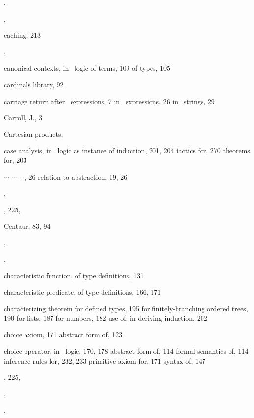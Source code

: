 \begin{theindex}
  \indexspace

  \item {}, 
  \item {}, 
  \item caching, 213
  \item {}, 
  \item canonical contexts, in \HOL\ logic
    \subitem of terms, 109
    \subitem of types, 105
  \item cardinals library, 92
  \item carriage return
    \subitem after \ML\ expressions, 7
    \subitem in \ML\ expressions, 26
    \subitem in \ML\ strings, 29
  \item Carroll, J., 3
  \item Cartesian products, 
  \item case analysis, in \HOL\ logic
    \subitem as instance  of induction, 201, 204
    \subitem tactics for, 270
    \subitem theorems for, 203
  \item {\small{} $\cdots$  $\cdots$ \ml{|} $\cdots$}, 26
    \subitem relation to abstraction, 19, 26
  \item {}, 
  \item {}, 225, 
  \item Centaur, 83, 94
  \item {}, 
  \item {}, 
  \item characteristic function, of type definitions, 131
  \item characteristic predicate, of type definitions, 166, 171
  \item characterizing theorem
    \subitem for defined types, 195
    \subitem for finitely-branching ordered trees, 190
    \subitem for lists, 187
    \subitem for numbers, 182
    \subitem use of, in deriving induction, 202
  \item choice axiom, 171
    \subitem abstract form of, 123
  \item choice operator, in \HOL\ logic, 170, 178
    \subitem abstract form of, 114
    \subitem formal semantics of, 114
    \subitem inference rules for, 232, 233
    \subitem primitive axiom for, 171
    \subitem syntax of, 147
  \item {}, 225, 
  \item {}, 
  \item {}, 

\end{theindex}
